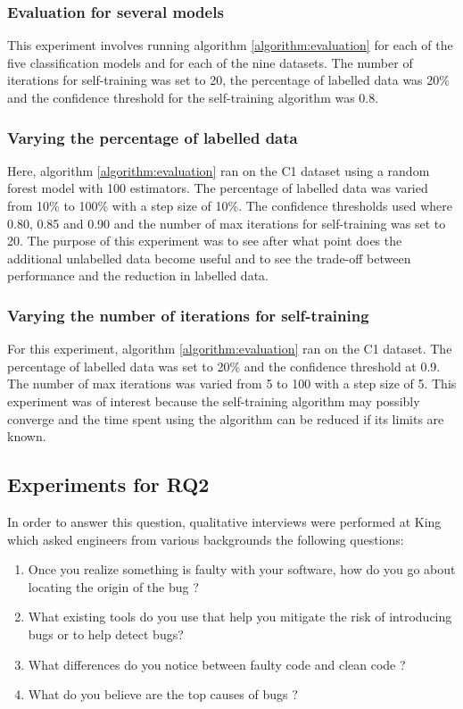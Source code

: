 \documentclass[../main.tex]{subfiles}
\begin{document}
\subsubsection{Evaluation for several models}

This experiment involves running algorithm \ref{algorithm:evaluation} for each of the five classification models and for each of the nine datasets. The number of iterations for self-training was set to 20, the percentage of labelled data was 20\% and the confidence threshold for the self-training algorithm was 0.8.  

\subsubsection{Varying the percentage of labelled data}

Here, algorithm \ref{algorithm:evaluation} ran on the C1 dataset using a random forest model with 100 estimators. The percentage of labelled data was varied from 10\% to 100\% with a step size of 10\%. The confidence thresholds used where 0.80, 0.85 and 0.90 and the number of max iterations for self-training was set to 20. The purpose of this experiment was to see after what point does the additional unlabelled data become useful and to see the trade-off between performance and the reduction in labelled data.

\subsubsection{Varying the number of iterations for self-training}

For this experiment, algorithm \ref{algorithm:evaluation} ran on the C1 dataset. The percentage of labelled data was set to 20\% and the confidence threshold at 0.9. The number of max iterations was varied from 5 to 100 with a step size of 5. This experiment was of interest because the self-training algorithm may possibly converge and the time spent using the algorithm can be reduced if its limits are known. 

\subsection{Experiments for RQ2}

In order to answer this question, qualitative interviews were performed at King which asked engineers from various backgrounds the following questions:

\begin{enumerate}
    \item Once you realize something is faulty with your software, how do you go about locating the origin of the bug ?
    \item What existing tools do you use that help you mitigate the risk of introducing bugs or to help detect bugs?
    \item What differences do you notice between faulty code and clean code ?
    \item What do you believe are the top causes of bugs ? 
\end{enumerate}
\end{document}
